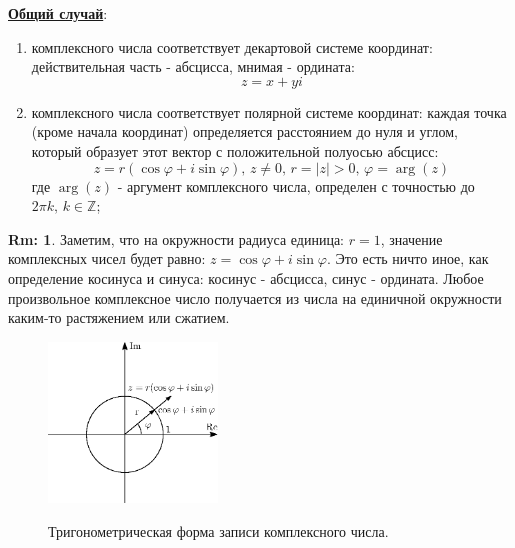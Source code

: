 \documentclass[12pt]{article}
\newcommand{\MZ}{\mathbb{Z}}
\theoremstyle{definition}
\newtheorem{rem}{Rm:}
\begin{document}
\textbf{\uline{Общий случай}}: 
\begin{enumerate}[label=\arabic*)]
	\item {} комплексного числа соответствует декартовой системе координат: действительная часть - абсцисса, мнимая - ордината:
	$$
		z = x + yi
	$$
	\item {} комплексного числа соответствует полярной системе координат: каждая точка (кроме начала координат) определяется расстоянием до нуля и углом, который образует этот вектор с положительной полуосью абсцисс:
	$$
		z = r(\cos\varphi + i\sin\varphi), \, z \neq 0, \, r = |z| > 0, \, \varphi = \arg(z)
	$$
	где $\arg(z)$ - аргумент комплексного числа, определен с точностью до $2\pi k,\, k \in \MZ$;
\end{enumerate} 
\begin{rem}
	Заметим, что на окружности радиуса единица: $r = 1$, значение комплексных чисел будет равно: $z = \cos\varphi + i\sin\varphi$. Это есть ничто иное, как определение косинуса и синуса: косинус - абсцисса, синус - ордината. Любое произвольное комплексное число получается из числа на единичной окружности каким-то растяжением или сжатием.
\end{rem}
\begin{figure}[H]
	\centering
	\includegraphics[width=0.4\textwidth]{AL1S2_9.eps}
	\label{2_9}
	\caption{Тригонометрическая форма записи комплексного числа.}
\end{figure}
\end{document}
